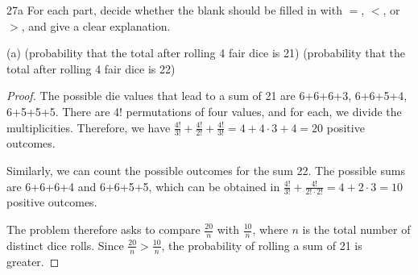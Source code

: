 \begin{exercise}{27a}
For each part, decide whether the blank should be filled in with $=$, $<$, or $>$, and give
a clear explanation.

(a) (probability that the total after rolling 4 fair dice is 21) (probability that the
total after rolling 4 fair dice is 22)
\end{exercise}

\begin{proof}
    The possible die values that lead to a sum of 21 are 6+6+6+3, 6+6+5+4, 6+5+5+5. There are 4! permutations of four values, and for each, we divide the multiplicities. Therefore, we have
    $\frac{4!}{3!} + \frac{4!}{2!} + \frac{4!}{3!} = 4 + 4 \cdot 3 + 4 = 20$ positive outcomes.
    
    
    Similarly, we can count the possible outcomes for the sum 22. The possible sums are 6+6+6+4 and 6+6+5+5, which can be obtained in $\frac{4!}{3!} + \frac{4!}{2! \cdot 2!} = 4 + 2 \cdot 3 = 10$ positive outcomes.

    The problem therefore asks to compare $\frac{20}{n}$ with $\frac{10}{n}$, where $n$ is the total number of distinct dice rolls. Since $\frac{20}{n} > \frac{10}{n}$, the probability of rolling a sum of 21 is greater.
\end{proof}

